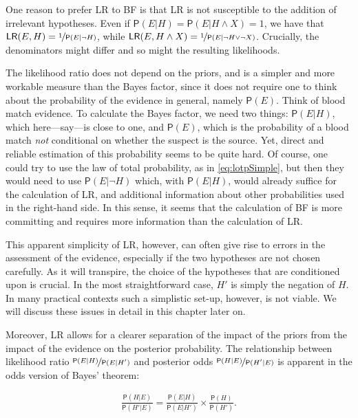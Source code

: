 \documentclass[10pt,dvipsnames,enabledeprecatedfontcommands]{scrartcl}
\newcommand{\n}{\neg}
\newcommand{\et}{\wedge}
\newcommand{\pr}[1]{\mathsf{P}(#1)}
\begin{document}
One reason to prefer \textsf{LR} to \textsf{BF} is that \textsf{LR} is
not susceptible to the addition of irrelevant hypotheses. Even if
\(\pr{E\vert H} = \pr{E\vert H \et X} = 1\), we have that
\(\mathsf{LR}(E,H) = \nicefrac{1}{\pr{E \vert \n H}}\), while
\(\mathsf{LR}(E, H \et X) = \nicefrac{1}{\pr{E \vert \n H \vee \n X}}\).
Crucially, the denominators might differ and so might the resulting
likelihoods.

The likelihood ratio does not depend on the priors, and is a simpler and
more workable measure than the Bayes factor, since it does not require
one to think about the probability of the evidence in general, namely
\(\pr{E}\). Think of blood match evidence. To calculate the Bayes
factor, we need two things: \(\pr{E\vert H}\), which here---say---is
close to one, and \(\pr{E}\), which is the probability of a blood match
\emph{not} conditional on whether the suspect is the source. Yet, direct
and reliable estimation of this probability seems to be quite hard. Of
course, one could try to use the law of total probability, as in
\eqref{eq:lotpSimple}, but then they would need to use
\(\pr{E\vert \n H}\) which, with \(\pr{E\vert H}\), would already
suffice for the calculation of \textsf{LR}, and additional information
about other probabilities used in the right-hand side. In this sense, it
seems that the calculation of \textsf{BF} is more committing and
requires more information than the calculation of \textsf{LR}.

This apparent simplicity of \textsf{LR}, however, can often give rise to
errors in the assessment of the evidence, especially if the two
hypotheses are not chosen carefully. As it will transpire, the choice of
the hypotheses that are conditioned upon is crucial. In the most
straightforward case, \(H'\) is simply the negation of \(H\). In many
practical contexts such a simplistic set-up, however, is not viable. We
will discuss these issues in detail in this chapter later on.

Moreover, \textsf{LR} allows for a clearer separation of the impact of
the priors from the impact of the evidence on the posterior probability.
The relationship between likelihood ratio
\(\nicefrac{\pr{E \vert H}}{\pr{E \vert H'}}\) and posterior odds
\(\nicefrac{\pr{H \vert E}}{\pr{H' \vert E}}\) is apparent in the odds
version of Bayes' theorem:

\begin{align}\label{eq:BTodds}
\frac{\pr{H \vert E}}{\pr{H' \vert E}}= \frac{\pr{E \vert H}}{\pr{E \vert H'}}\times \frac{\pr{H}}{\pr{H'}}.
\end{align}
\end{document}
